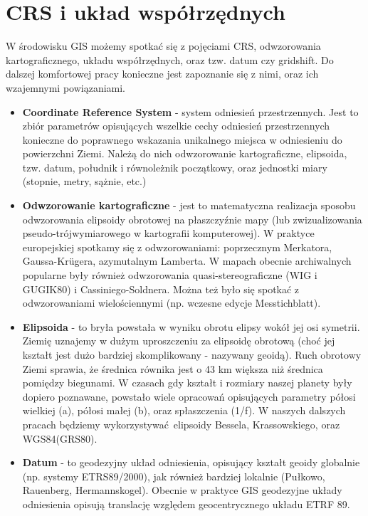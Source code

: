 \documentclass[a4paper,11pt, onecolumn, openany]{memoir}
\begin{document}
		\section{CRS i układ współrzędnych}
		W środowisku GIS możemy spotkać się z pojęciami CRS, odwzorowania kartograficznego, układu współrzędnych, oraz tzw. datum czy gridshift. Do dalszej komfortowej pracy konieczne jest zapoznanie się z nimi, oraz ich wzajemnymi powiązaniami.
		\begin{itemize}
			\item 		\textbf{Coordinate Reference System} - system odniesień przestrzennych. Jest to zbiór parametrów opisujących wszelkie cechy odniesień przestrzennych konieczne do poprawnego wskazania unikalnego miejsca w odniesieniu do powierzchni Ziemi. Należą do nich odwzorowanie kartograficzne, elipsoida, tzw. datum, południk i równoleżnik początkowy, oraz jednostki miary (stopnie, metry, sążnie, etc.)
			\item \textbf{Odwzorowanie kartograficzne} - jest to matematyczna realizacja sposobu odwzorowania elipsoidy obrotowej na płaszczyźnie mapy (lub zwizualizowania pseudo-trójwymiarowego w kartografii komputerowej). W praktyce europejskiej spotkamy się z odwzorowaniami: poprzecznym Merkatora, Gaussa-Kr\"{u}gera, azymutalnym Lamberta. W mapach obecnie archiwalnych popularne były również odwzorowania quasi-stereograficzne (WIG i GUGIK80) i Cassiniego-Soldnera. Można też było się spotkać z odwzorowaniami wielościennymi (np. wczesne edycje Messtichblatt).
			\item \textbf{Elipsoida} - to bryła powstała w wyniku obrotu elipsy wokół jej osi symetrii. Ziemię uznajemy w dużym uproszczeniu za elipsoidę obrotową (choć jej kształt jest dużo bardziej skomplikowany - nazywany geoidą). Ruch obrotowy Ziemi sprawia, że średnica równika jest o 43 km większa niż średnica pomiędzy biegunami. W czasach gdy kształt i rozmiary naszej planety były dopiero poznawane, powstało wiele opracowań opisujących parametry półosi wielkiej (a), półosi małej (b), oraz spłaszczenia (1/f). W naszych dalszych pracach będziemy wykorzystywać elipsoidy Bessela, Krassowskiego, oraz WGS84(GRS80).
			\item \textbf{Datum} - to geodezyjny układ odniesienia, opisujący kształt geoidy globalnie (np. systemy ETRS89/2000), jak również bardziej lokalnie (Pułkowo, Rauenberg, Hermannskogel). Obecnie w praktyce GIS geodezyjne układy odniesienia opisują translację względem geocentrycznego układu ETRF 89.
			\begin{figure}[!ht]
				\centering

\end{figure}
\end{itemize}
\end{document}
